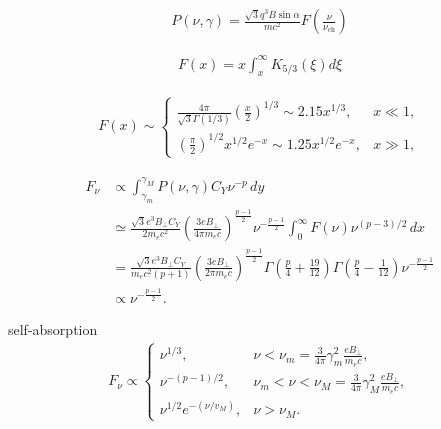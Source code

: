 \documentclass{article}
\begin{document}
\begin{align*}
    P(\nu, \gamma) = \frac{\sqrt{3} q^3 B \sin \alpha}{mc^2} F \left( \frac{\nu}{\nu_{\text{ch}}} \right)
\end{align*}

\begin{align*}
    F(x) = x \int_x^\infty K_{5/3}(\xi) d\xi
\end{align*}

\begin{align*}
    F(x) \sim \begin{cases}
                  \frac{4\pi}{\sqrt{3}\Gamma(1/3)} \left(\frac{x}{2}\right)^{1/3} \sim 2.15x^{1/3}, & x \ll 1, \\
                  \left(\frac{\pi}{2}\right)^{1/2} x^{1/2} e^{-x} \sim 1.25x^{1/2} e^{-x},          & x \gg 1,
              \end{cases}
\end{align*}


\begin{align*}
    F_\nu & \propto \int_{\gamma_m}^{\gamma_M} P(\nu, \gamma) C_Y \nu^{-p} \, dy                                                                                                                                                                   \\
          & \simeq \frac{\sqrt{3} e^3 B_\perp C_Y}{2m_e c^2} \left( \frac{3 e B_\perp}{4\pi m_e c} \right)^{\frac{p-1}{2}} \nu^{-\frac{p-1}{2}} \int_{0}^{\infty} F(\nu) \nu^{(p-3)/2} \, dx                                                       \\
          & = \frac{\sqrt{3} e^3 B_\perp C_Y}{m_e c^2 (p+1)} \left( \frac{3 e B_\perp}{2\pi m_e c} \right)^{\frac{p-1}{2}} \Gamma \left( \frac{p}{4} + \frac{19}{12} \right) \Gamma \left( \frac{p}{4} - \frac{1}{12} \right) \nu^{-\frac{p-1}{2}} \\
          & \propto \nu^{-\frac{p-1}{2}}.
\end{align*}

self-absorption
\begin{align*}
    F_\nu \propto \begin{cases}
                      \nu^{1/3},                & \nu < \nu_m = \frac{3}{4\pi} \gamma_m^2 \frac{e B_\perp}{m_e c},         \\
                      \nu^{- (p-1)/2},          & \nu_m < \nu < \nu_M = \frac{3}{4\pi} \gamma_M^2 \frac{e B_\perp}{m_e c}, \\
                      \nu^{1/2} e^{-(\nu/v_M)}, & \nu > \nu_M.
                  \end{cases}
\end{align*}
\end{document}
